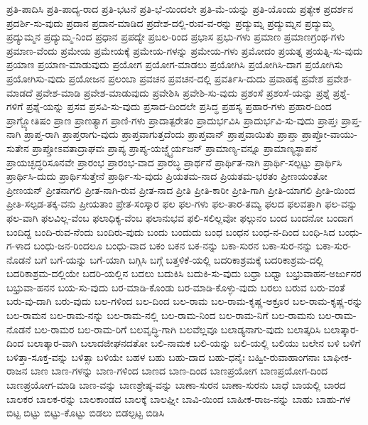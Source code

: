 {ಪ್ರತಿ-ಪಾದಿಸಿ
ಪ್ರತಿ-ಪಾದ್ಯ-ರಾದ
ಪ್ರತಿ-ಭಟನೆ
ಪ್ರತಿ-ಭೆ-ಯಿಂದಲೇ
ಪ್ರತಿ-ಮೆ-ಯನ್ನು
ಪ್ರತಿ-ಯೊಂದು
ಪ್ರತ್ಯೇಕ
ಪ್ರದರ್ಶನ
ಪ್ರದರ್ಶಿ-ಸು-ವುದು
ಪ್ರದಾನ
ಪ್ರದಾನ-ಮಾಡಿದ
ಪ್ರದೇಶ-ದಲ್ಲಿ-ರುವ-ವ-ರನ್ನು
ಪ್ರದ್ಯುಮ್ನ
ಪ್ರದ್ಯುಮ್ನನ
ಪ್ರದ್ಯುಮ್ಮ
ಪ್ರದ್ಯುಮ್ಮನ
ಪ್ರದ್ಯುಮ್ಮ-ನಿಂದ
ಪ್ರಧಾನ
ಪ್ರಪದ್ಯೇ
ಪ್ರಬಲ-ರಿಂದ
ಪ್ರಭಾಸ
ಪ್ರಭು-ಗಳು
ಪ್ರಮಾಣ
ಪ್ರಮಾಣಗ್ರಂಥ-ಗಳು
ಪ್ರಮಾಣ-ವೆಂದು
ಪ್ರಮೇಯ
ಪ್ರಮೇಯಕ್ಕೆ
ಪ್ರಮೇಯ-ಗಳನ್ನು
ಪ್ರಮೇಯ-ಗಳು
ಪ್ರಮೋದಂ
ಪ್ರಯತ್ನ
ಪ್ರಯತ್ನಿ-ಸು-ವುದು
ಪ್ರಯಾಣ
ಪ್ರಯಾಣ-ಮಾಡುವುದು
ಪ್ರಯೋಗ
ಪ್ರಯೋಗ-ಮಾಡಲು
ಪ್ರಯೋಗಿಸಿ
ಪ್ರಯೋಗಿಸಿ-ದಾಗ
ಪ್ರಯೋಗಿಸು
ಪ್ರಯೋಗಿಸು-ವುದು
ಪ್ರಯೋಜನ
ಪ್ರಲಂಬಾ
ಪ್ರವಚನ
ಪ್ರವಚನ-ದಲ್ಲಿ
ಪ್ರವರ್ತಿಸಿ-ದುದು
ಪ್ರವಾಹಕ್ಕೆ
ಪ್ರವೇಶ
ಪ್ರವೇಶ-ಮಾಡದೆ
ಪ್ರವೇಶ-ಮಾಡಿ
ಪ್ರವೇಶ-ಮಾಡುವುದು
ಪ್ರವೇಶಿಸಿ
ಪ್ರವೇಶಿ-ಸು-ವುದು
ಪ್ರಶಂಸೆ
ಪ್ರಶಂಸೆ-ಯನ್ನು
ಪ್ರಶ್ನೆ
ಪ್ರಶ್ನೆ-ಗಳಿಗೆ
ಪ್ರಶ್ನೆ-ಯನ್ನು
ಪ್ರಸವ
ಪ್ರಸವಿ-ಸು-ವುದು
ಪ್ರಸಾದ-ದಿಂದಲೇ
ಪ್ರಸಿದ್ಧ
ಪ್ರಹಸ್ಯ
ಪ್ರಹಾರ-ಗಳು
ಪ್ರಹಾರ-ದಿಂದ
ಪ್ರಾಗ್ಜ್ಯೋತಿಷಂ
ಪ್ರಾಣ
ಪ್ರಾಣತ್ಯಾಗ
ಪ್ರಾಣಿ-ಗಳು
ಪ್ರಾದಾತ್ಪರೇತಂ
ಪ್ರಾದುರ್ಭವಿಸಿ
ಪ್ರಾದುರ್ಭವಿ-ಸು-ವುದು
ಪ್ರಾಪ್ತಃ
ಪ್ರಾಪ್ತ-ನಾಗಿ
ಪ್ರಾಪ್ತ-ರಾಗಿ
ಪ್ರಾಪ್ತರಾಗು-ವುದು
ಪ್ರಾಪ್ತವಾಗುತ್ತದೆಂದು
ಪ್ರಾಪ್ತವಾನ್
ಪ್ರಾಪ್ತವಾಯಿತು
ಪ್ರಾಪ್ತಾ
ಪ್ರಾಪ್ತೋ-ವಾಯು-ಸುತೇನ
ಪ್ರಾಪ್ತೋಽವತಾದ್ರಾಘವಃ
ಪ್ರಾಪ್ಯ
ಪ್ರಾಪ್ಯ-ಯಜ್ಚ್ನೈರ್ಯಜನ್
ಪ್ರಾಮಾಣ್ಯ-ವನ್ನೂ
ಪ್ರಾಮಾಣ್ಯಸ್ಥಾಪನೆ
ಪ್ರಾಯಚ್ಛದ್ಧರಿಸೂನವೇ
ಪ್ರಾರಂಭ
ಪ್ರಾರಂಭ-ವಾದ
ಪ್ರಾರಬ್ಧ
ಪ್ರಾರ್ಥನೆ
ಪ್ರಾರ್ಥಿತ-ನಾಗಿ
ಪ್ರಾರ್ಥಿ-ಸಲ್ಪಟ್ಟು
ಪ್ರಾರ್ಥಿಸಿ
ಪ್ರಾರ್ಥಿಸಿ-ದುದು
ಪ್ರಾರ್ಥಿಸುತ್ತೇನೆ
ಪ್ರಾರ್ಥಿ-ಸು-ವುದು
ಪ್ರಿಯತಮ-ನಾದ
ಪ್ರಿಯತಮ-ಭರತಂ
ಪ್ರೀಣಯಂತೋ
ಪ್ರೀಣಯನ್
ಪ್ರೀತನಾಗಲಿ
ಪ್ರೀತ-ನಾಗಿ-ರುವ
ಪ್ರೀತ-ನಾದ
ಪ್ರೀತಿ
ಪ್ರೀತಿ-ಕಾರೀ
ಪ್ರೀತಿ-ಗಾಗಿ
ಪ್ರೀತಿ-ಯಾಗಲಿ
ಪ್ರೀತಿ-ಯಿಂದ
ಪ್ರೀತಿ-ಸಲ್ಪಡ-ತಕ್ಕ-ವನು
ಪ್ರೀಯತಾಂ
ಪ್ರೇತ-ಸಂಸ್ಕಾರ
ಫಲ
ಫಲ-ಗಳು
ಫಲ-ತಾರ-ತಮ್ಯ
ಫಲದ
ಫಲವತ್ತಾಗಿ
ಫಲ-ವನ್ನು
ಫಲ-ವಾಗಿ
ಫಲವಿಲ್ಲ-ವೆಂಬ
ಫಲಾಧಿಕ್ಯ-ವೆಂಬ
ಫಲಾನುಭವ
ಫಲಿ-ಸಲಿಲ್ಲವೋ
ಫಲ್ಗುನಂ
ಬಂದ
ಬಂದನೋ
ಬಂದಾಗ
ಬಂದಿದ್ದ
ಬಂದಿ-ರುವ-ನೆಂದು
ಬಂದಿರು-ವುದು
ಬಂದು
ಬಂದುದು
ಬಂಧ
ಬಂಧನ
ಬಂಧ-ನ-ದಿಂದ
ಬಂಧಿ-ಸಿದ
ಬಂಧು-ಗ-ಳಾದ
ಬಂಧು-ಜನ-ರಿಂದಲೂ
ಬಂಧು-ವಾದ
ಬಕಂ
ಬಕನ
ಬಕ-ನನ್ನು
ಬಕಾ-ಸುರನ
ಬಕಾ-ಸುರ-ನನ್ನು
ಬಕಾ-ಸುರ-ನೊಡನೆ
ಬಗೆ
ಬಗೆ-ಯನ್ನು
ಬಗೆ-ಯಾಗಿ
ಬಗ್ಗಿಸಿ
ಬಗ್ಗೆ
ಬತ್ತಳಿಕೆ-ಯಲ್ಲಿ
ಬದರಿಕಾಶ್ರಮಕ್ಕೆ
ಬದರಿಕಾಶ್ರಮ-ದಲ್ಲಿ
ಬದರಿಕಾಶ್ರಮ-ದಲ್ಲಿಯೇ
ಬದರಿ-ಯಲ್ಲಿನ
ಬದಲು
ಬದುಕಿಸಿ
ಬದುಕಿ-ಸು-ವುದು
ಬಧ್ರಾ
ಬಧ್ವಾ
ಬಭ್ರುವಾಹನ-ಅರ್ಜುನರ
ಬಭ್ರುವಾ-ಹನನ
ಬಯ-ಸು-ವುದು
ಬರ-ಮಾಡಿ-ಕೊಂಡು
ಬರ-ಮಾಡಿ-ಕೊಳ್ಳು-ವುದು
ಬರಲು
ಬರುವ
ಬರು-ವಂತೆ
ಬರು-ವು-ದಾಗಿ
ಬರು-ವುದು
ಬಲ-ಗಳಿಂದ
ಬಲ-ದಿಂದ
ಬಲ-ರಾಮ
ಬಲ-ರಾಮ-ಕೃಷ್ಣ-ಅಕ್ರೂರ
ಬಲ-ರಾಮ-ಕೃಷ್ಣ-ರನ್ನು
ಬಲ-ರಾಮನ
ಬಲ-ರಾಮ-ನನ್ನು
ಬಲ-ರಾಮ-ನಲ್ಲಿ
ಬಲ-ರಾಮ-ನಿಂದ
ಬಲ-ರಾಮ-ನಿಗೆ
ಬಲ-ರಾಮನು
ಬಲ-ರಾಮ-ನೊಡನೆ
ಬಲ-ರಾಮರ
ಬಲ-ರಾಮ-ರಿಗೆ
ಬಲವೃದ್ಧಿ-ಗಾಗಿ
ಬಲವೆಲ್ಲವೂ
ಬಲಾಡ್ಯನಾಗು-ವುದು
ಬಲಾತ್ಕರಿಸಿ
ಬಲಾತ್ಕಾರ-ದಿಂದ
ಬಲಾತ್ಕಾರ-ವಾಗಿ
ಬಲಾದಜೀಘನದತೋ
ಬಲಿ-ನಾಮಕ
ಬಲಿ-ಯನ್ನು
ಬಲಿ-ಯಲ್ಲಿ
ಬಲಿಯು
ಬಲೇನ
ಬಳಿ
ಬಳಿಗೆ
ಬಳಿತ್ತಾ-ಸೂಕ್ತ-ವನ್ನು
ಬಳಿತ್ಸಾ
ಬಳಿಯೇ
ಬಹಳ
ಬಹು
ಬಹು-ದಾದ
ಬಹು-ಧನೈಃ
ಬಹ್ವೀ-ರುವಾಹಾಂಗನಾಃ
ಬಾಘೀಕ-ರಾಜನ
ಬಾಣ
ಬಾಣ-ಗಳನ್ನು
ಬಾಣ-ಗಳಿಂದ
ಬಾಣದ
ಬಾಣ-ದಿಂದ
ಬಾಣಪ್ರಯೋಗ
ಬಾಣಪ್ರಯೋಗ-ದಿಂದ
ಬಾಣಪ್ರಯೋಗ-ಮಾಡಿ
ಬಾಣ-ವನ್ನು
ಬಾಣಶ್ರೇಷ್ಠ-ವನ್ನು
ಬಾಣಾ-ಸುರನ
ಬಾಣಾ-ಸುರನು
ಬಾಧೆ
ಬಾಯಲ್ಲಿ
ಬಾರದ
ಬಾಲಕರ
ಬಾಲಕ-ರನ್ನು
ಬಾಲಕಾಂಡದ
ಬಾಲಕ್ಕೆ
ಬಾಲಘ್ನೀ
ಬಾವಿ-ಯಿಂದ
ಬಾಹೀಕ-ರಾಜ-ನನ್ನು
ಬಾಹು
ಬಾಹು-ಗಳ
ಬಿಟ್ಟ
ಬಿಟ್ಟು
ಬಿಟ್ಟು-ಕೊಟ್ಟು
ಬಿಡಲು
ಬಿಡಲ್ಪಟ್ಟ
ಬಿಡಿಸಿ
}
